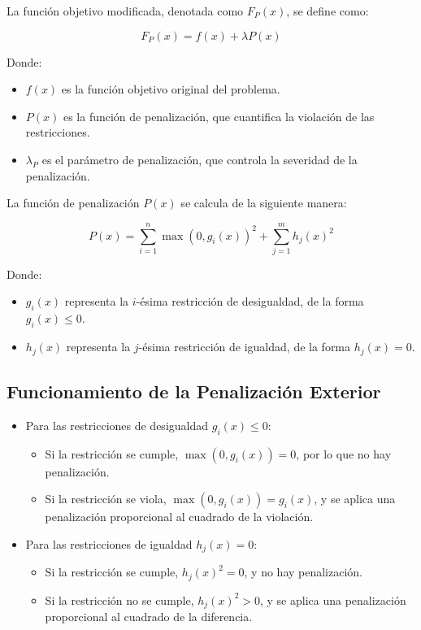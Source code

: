 La función objetivo modificada, denotada como \( F_P(x) \), se define como:

\[
F_P(x) = f(x) + \lambda P(x)
\]

Donde:

\begin{itemize}
    \item \( f(x) \) es la función objetivo original del problema.
    \item \( P(x) \) es la función de penalización, que cuantifica la violación de las restricciones.
    \item \( \lambda_P \) es el parámetro de penalización, que controla la severidad de la penalización.
\end{itemize}

La función de penalización \( P(x) \) se calcula de la siguiente manera:

\[
P(x) = \sum_{i=1}^{n} \max(0, g_i(x))^2 + \sum_{j=1}^{m} h_j(x)^2
\]

Donde:

\begin{itemize}
    \item \( g_i(x) \) representa la \( i \)-ésima restricción de desigualdad, de la forma \( g_i(x) \leq 0 \).
    \item \( h_j(x) \) representa la \( j \)-ésima restricción de igualdad, de la forma \( h_j(x) = 0 \).
\end{itemize}

\subsection*{Funcionamiento de la Penalización Exterior}

\begin{itemize}
    \item Para las restricciones de desigualdad \( g_i(x) \leq 0 \):
    \begin{itemize}
        \item Si la restricción se cumple, \( \max(0, g_i(x)) = 0 \), por lo que no hay penalización.
        \item Si la restricción se viola, \( \max(0, g_i(x)) = g_i(x) \), y se aplica una penalización proporcional al cuadrado de la violación.
    \end{itemize}
    \item Para las restricciones de igualdad \( h_j(x) = 0 \):
    \begin{itemize}
        \item Si la restricción se cumple, \( h_j{(x)}^2 = 0 \), y no hay penalización.
        \item Si la restricción no se cumple, \( h_j{(x)}^2 > 0 \), y se aplica una penalización proporcional al cuadrado de la diferencia.
    \end{itemize}
\end{itemize}


